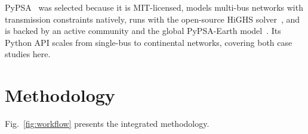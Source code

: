 \documentclass[conference,10pt]{IEEEtran}
\begin{document}
PyPSA~\cite{pypsa} was selected because it is MIT-licensed, models multi-bus networks with transmission constraints natively, runs with the open-source HiGHS solver~\cite{highs}, and is backed by an active community and the global PyPSA-Earth model~\cite{pypsa_earth}. Its Python API scales from single-bus to continental networks, covering both case studies here.

\section{Methodology}

Fig.~\ref{fig:workflow} presents the integrated methodology.

\end{document}
